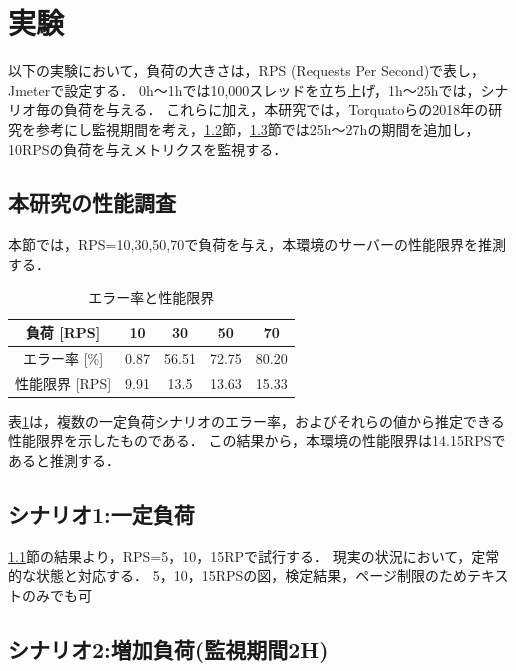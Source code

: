 \documentclass[twoside,twocolumn,10pt]{jarticle}  %
\begin{document}
\section{実験}
以下の実験において，負荷の大きさは，RPS (Requests Per Second)で表し，Jmeterで設定する．
0h～1hでは10,000スレッドを立ち上げ，1h～25hでは，シナリオ毎の負荷を与える．
これらに加え，本研究では，Torquatoらの2018年の研究を参考にし監視期間を考え，\ref{subsec:load1}節，\ref{subsec:load2}節では25h～27hの期間を追加し，10RPSの負荷を与えメトリクスを監視する．
\subsection{本研究の性能調査}\label{subsec:limit}
本節では，RPS=10,30,50,70で負荷を与え，本環境のサーバーの性能限界を推測する．
\begin{table}[h]
  \centering
  \caption{エラー率と性能限界}
  \label{tab:rps}
  \begin{tabular}{ccccc}
    \hline \hline
    負荷 [RPS] & 10 & 30 & 50 & 70 \\ \hline
    エラー率 [\%] & 0.87 & 56.51 & 72.75 & 80.20 \\ \hline
    性能限界 [RPS] & 9.91 & 13.5 & 13.63 & 15.33 \\ \hline
  \end{tabular}
\end{table}

表\ref{tab:rps}は，複数の一定負荷シナリオのエラー率，およびそれらの値から推定できる性能限界を示したものである．
この結果から，本環境の性能限界は14.15RPSであると推測する．

\subsection{シナリオ1:一定負荷}\label{subsec:load1}
\ref{subsec:limit}節の結果より，RPS=5，10，15RPで試行する．
現実の状況において，定常的な状態と対応する．
5，10，15RPSの図，検定結果，ページ制限のためテキストのみでも可

\subsection{シナリオ2:増加負荷(監視期間2H)}
\label{subsec:load2} 
\end{document}

